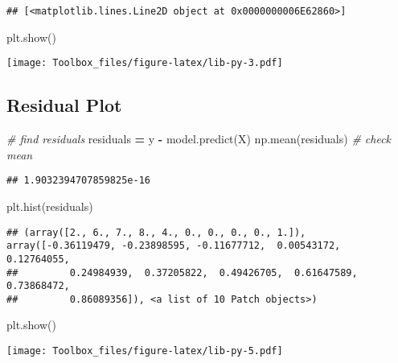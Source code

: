 \documentclass[
]{book}
\newenvironment{Shaded}{\begin{snugshade}}{\end{snugshade}}
\newcommand{\CommentTok}[1]{\textcolor[rgb]{0.56,0.35,0.01}{\textit{#1}}}
\newcommand{\NormalTok}[1]{#1}
\newcommand{\OperatorTok}[1]{\textcolor[rgb]{0.81,0.36,0.00}{\textbf{#1}}}
\begin{document}
\begin{verbatim}
## [<matplotlib.lines.Line2D object at 0x0000000006E62860>]
\end{verbatim}

\begin{Shaded}
\begin{Highlighting}[]
\NormalTok{plt.show()}
\end{Highlighting}
\end{Shaded}

\texttt{[image: Toolbox\_files/figure-latex/lib-py-3.pdf]}

\hypertarget{residual-plot}{%
\subsection{Residual Plot}\label{residual-plot}}

\begin{Shaded}
\begin{Highlighting}[]
\CommentTok{\# find residuals}
\NormalTok{residuals }\OperatorTok{=}\NormalTok{ y }\OperatorTok{{-}}\NormalTok{ model.predict(X)}
\NormalTok{np.mean(residuals) }\CommentTok{\# check mean}
\end{Highlighting}
\end{Shaded}

\begin{verbatim}
## 1.9032394707859825e-16
\end{verbatim}

\begin{Shaded}
\begin{Highlighting}[]
\NormalTok{plt.hist(residuals)}
\end{Highlighting}
\end{Shaded}

\begin{verbatim}
## (array([2., 6., 7., 8., 4., 0., 0., 0., 0., 1.]), array([-0.36119479, -0.23898595, -0.11677712,  0.00543172,  0.12764055,
##         0.24984939,  0.37205822,  0.49426705,  0.61647589,  0.73868472,
##         0.86089356]), <a list of 10 Patch objects>)
\end{verbatim}

\begin{Shaded}
\begin{Highlighting}[]
\NormalTok{plt.show()}
\end{Highlighting}
\end{Shaded}

\texttt{[image: Toolbox\_files/figure-latex/lib-py-5.pdf]}
\end{document}

